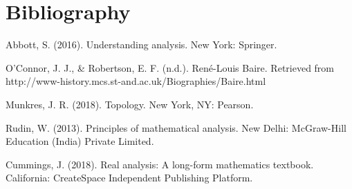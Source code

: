\documentclass{article}
\theoremstyle{definition}
\theoremstyle{remark}
\theoremstyle{definition}
\begin{document}
\newpage

\section*{Bibliography}

\vspace{4mm}

\begin{enumerate}[leftmargin=*, label={[\arabic*]}]
    \item Abbott, S. (2016). Understanding analysis. New York: Springer.
    
    \item O'Connor, J. J., & Robertson, E. F. (n.d.). René-Louis Baire. Retrieved from http://www-history.mcs.st-and.ac.uk/Biographies/Baire.html
    
    \item Munkres, J. R. (2018). Topology. New York, NY: Pearson.
    
    \item Rudin, W. (2013). Principles of mathematical analysis. New Delhi: McGraw-Hill Education (India) Private Limited.
    
    \item Cummings, J. (2018). Real analysis: A long-form mathematics textbook. California: CreateSpace Independent Publishing Platform.
    
\end{enumerate}

 
\end{document}
